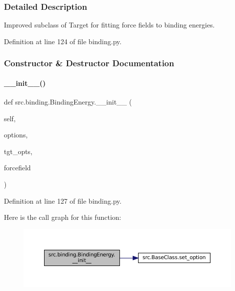 \subsubsection{Detailed Description}
Improved subclass of Target for fitting force fields to binding energies. 



Definition at line 124 of file binding.\+py.



\subsubsection{Constructor \& Destructor Documentation}
\mbox{\label{classsrc_1_1binding_1_1BindingEnergy_ab154e10c3317f8140634bee726d177d6}} 
\paragraph{\texorpdfstring{\+\_\+\+\_\+init\+\_\+\+\_\+()}{\_\_init\_\_()}}
{\footnotesize\ttfamily def src.\+binding.\+Binding\+Energy.\+\_\+\+\_\+init\+\_\+\+\_\+ (\begin{DoxyParamCaption}\item[{}]{self,  }\item[{}]{options,  }\item[{}]{tgt\+\_\+opts,  }\item[{}]{forcefield }\end{DoxyParamCaption})}



Definition at line 127 of file binding.\+py.

Here is the call graph for this function\+:
\nopagebreak
\begin{figure}[H]
\begin{center}
\leavevmode
\includegraphics[width=350pt]{classsrc_1_1binding_1_1BindingEnergy_ab154e10c3317f8140634bee726d177d6_cgraph}
\end{center}
\end{figure}


